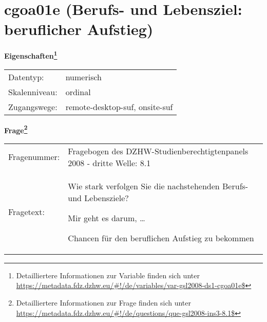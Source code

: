 
    \setcounter{footnote}{0}

    \vspace*{-1.8cm}
	\section{cgoa01e (Berufs- und Lebensziel: beruflicher Aufstieg)}
	\label{section:cgoa01e}



    \vspace*{0.5cm}
    \noindent\textbf{Eigenschaften\footnote{Detailliertere Informationen zur Variable finden sich unter
		\url{https://metadata.fdz.dzhw.eu/\#!/de/variables/var-gsl2008-ds1-cgoa01e$}}}\\
	\begin{tabularx}{\hsize}{@{}lX}
	Datentyp: & numerisch \\
	Skalenniveau: & ordinal \\
	Zugangswege: &
	  remote-desktop-suf, 
	  onsite-suf
 \\
    \end{tabularx}



				\vspace*{0.5cm}
                \noindent\textbf{Frage\footnote{Detailliertere Informationen zur Frage finden sich unter
		              \url{https://metadata.fdz.dzhw.eu/\#!/de/questions/que-gsl2008-ins3-8.1$}}}\\
				\begin{tabularx}{\hsize}{@{}lX}
					Fragenummer: &
					  Fragebogen des DZHW-Studienberechtigtenpanels 2008 - dritte Welle:
					  8.1
 \\
					Fragetext: & Wie stark verfolgen Sie die nachstehenden Berufs- und Lebensziele?\par  Mir geht es darum, …\par  Chancen für den beruflichen Aufstieg zu bekommen \\
				\end{tabularx}





